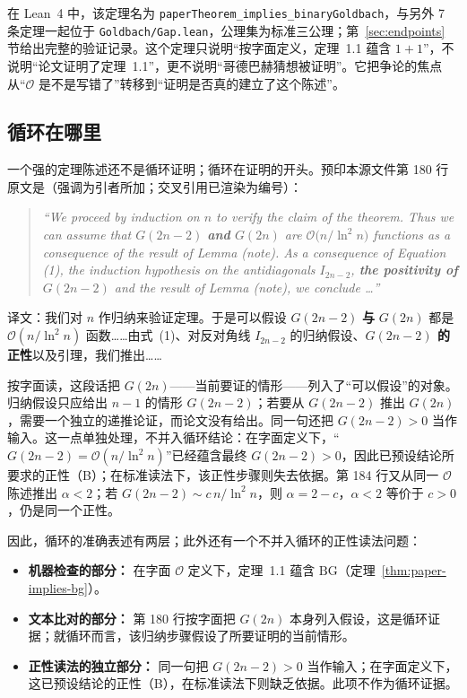 \documentclass[11pt,a4paper]{ctexart}
\theoremstyle{plain}
\theoremstyle{definition}
\newcommand{\BG}{\mathrm{BG}}
\begin{document}
在 Lean~4 中，该定理名为 \texttt{paperTheorem\_implies\_binaryGoldbach}，与另外 7 条定理一起位于 \texttt{Goldbach/Gap.lean}，公理集为标准三公理；第~\ref{sec:endpoints} 节给出完整的验证记录。这个定理只说明“按字面定义，定理~1.1 蕴含 $1+1$”，不说明“论文证明了定理~1.1”，更不说明“哥德巴赫猜想被证明”。它把争论的焦点从“$\mathcal O$ 是不是写错了”转移到“证明是否真的建立了这个陈述”。

\subsection{循环在哪里}
\label{sec:circularity}

一个强的定理陈述还不是循环证明；循环在证明的开头。预印本源文件第 180 行原文是（强调为引者所加；交叉引用已渲染为编号）：

\begin{quote}\itshape
“We proceed by induction on $n$ to verify the claim of the theorem. Thus we can assume that
$G(2n-2)$ \textbf{and} $G(2n)$ are $\mathcal O\bigl(n/\ln^{2} n\bigr)$ functions as a
consequence of the result of Lemma (note). As a consequence of Equation (1), the induction
hypothesis on the antidiagonals $I_{2n-2}$, \textbf{the positivity of $G(2n-2)$} and the
result of Lemma (note), we conclude \ldots”
\end{quote}

\noindent 译文：我们对 $n$ 作归纳来验证定理。于是可以假设 $G(2n-2)$ \textbf{与} $G(2n)$ 都是 $\mathcal O(n/\ln^2 n)$ 函数……由式~(1)、对反对角线 $I_{2n-2}$ 的归纳假设、\textbf{$G(2n-2)$ 的正性}以及引理，我们推出……

按字面读，这段话把 $G(2n)$——当前要证的情形——列入了“可以假设”的对象。归纳假设只应给出 $n-1$ 的情形 $G(2n-2)$；若要从 $G(2n-2)$ 推出 $G(2n)$，需要一个独立的递推论证，而论文没有给出。同一句还把 $G(2n-2)>0$ 当作输入。这一点单独处理，不并入循环结论：在字面定义下，“$G(2n-2)=\mathcal O(n/\ln^2 n)$”已经蕴含最终 $G(2n-2)>0$，因此已预设结论所要求的正性（B）；在标准读法下，该正性步骤则失去依据。第 184 行又从同一 $\mathcal O$ 陈述推出 $\alpha<2$；若 $G(2n-2)\sim c\,n/\ln^2 n$，则 $\alpha=2-c$，$\alpha<2$ 等价于 $c>0$，仍是同一个正性。

因此，循环的准确表述有两层；此外还有一个不并入循环的正性读法问题：

\begin{itemize}
\item \textbf{机器检查的部分：} 在字面 $\mathcal O$ 定义下，定理~1.1 蕴含 $\BG$（定理~\ref{thm:paper-implies-bg}）。
\item \textbf{文本比对的部分：} 第 180 行按字面把 $G(2n)$ 本身列入假设，这是循环证据；就循环而言，该归纳步骤假设了所要证明的当前情形。
\item \textbf{正性读法的独立部分：} 同一句把 $G(2n-2)>0$ 当作输入；在字面定义下，这已预设结论的正性（B），在标准读法下则缺乏依据。此项不作为循环证据。
\end{itemize}
\end{document}
